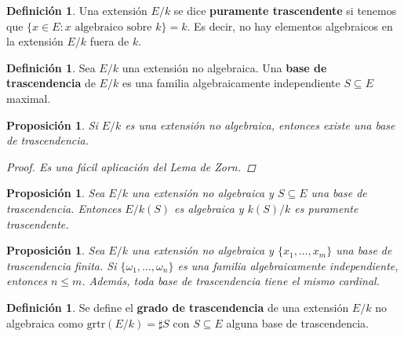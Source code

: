 \documentclass[12pt]{book}
\newtheorem{prop}[teo]{Proposición}
\theoremstyle{definition}
\newtheorem{defn}[teo]{Definición}
\begin{document}
\begin{defn}
Una extensión $E/k$ se dice \textbf{puramente trascendente} si tenemos que $\{x\in E : x \text{ algebraico sobre }k \}=k$. Es decir, no hay elementos algebraicos en la extensión $E/k$ fuera de $k$.
\end{defn}

\begin{defn}
Sea $E/k$ una extensión no algebraica. Una \textbf{base de trascendencia} de $E/k$ es una familia algebraicamente independiente $S\subseteq E$ maximal.
\end{defn}

\begin{prop}
Si $E/k$ es una extensión no algebraica, entonces existe una base de trascendencia.
\begin{proof}
Es una fácil aplicación del Lema de Zorn.
\end{proof}
\end{prop}

\begin{prop}
Sea $E/k$ una extensión no algebraica y $S\subseteq E$ una base de trascendencia. Entonces $E/k(S)$ es algebraica y $k(S)/k$ es puramente trascendente.
\end{prop}

\begin{prop}
Sea $E/k$ una extensión no algebraica y $\{x_1,\ldots , x_m\}$ una base de trascendencia finita. Si $\{\omega_1,\ldots , \omega_n\}$ es una familia algebraicamente independiente, entonces $n\leq m$. Además, toda base de trascendencia tiene el mismo cardinal.
\end{prop}

\begin{defn}
Se define el \textbf{grado de trascendencia} de una extensión $E/k$ no algebraica como $\mathrm{grtr}(E/k)=\sharp S$ con $S\subseteq E$ alguna base de trascendencia.
\end{defn}
\end{document}
